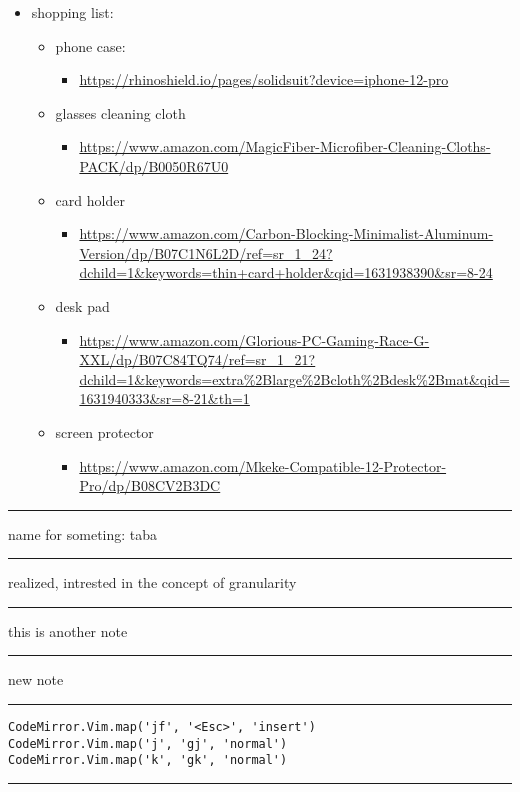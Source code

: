 \documentclass[letterpaper]{article}
\begin{document}
\begin{itemize}
\item shopping list:

\begin{itemize}
\item phone case:

\begin{itemize}
\item \url{https://rhinoshield.io/pages/solidsuit?device=iphone-12-pro}
\end{itemize}

\item glasses cleaning cloth

\begin{itemize}
\item \url{https://www.amazon.com/MagicFiber-Microfiber-Cleaning-Cloths-PACK/dp/B0050R67U0}
\end{itemize}

\item card holder

\begin{itemize}
\item \url{https://www.amazon.com/Carbon-Blocking-Minimalist-Aluminum-Version/dp/B07C1N6L2D/ref=sr\_1\_24?dchild=1\&keywords=thin+card+holder\&qid=1631938390\&sr=8-24}
\end{itemize}

\item desk pad

\begin{itemize}
\item \url{https://www.amazon.com/Glorious-PC-Gaming-Race-G-XXL/dp/B07C84TQ74/ref=sr\_1\_21?dchild=1\&keywords=extra\%2Blarge\%2Bcloth\%2Bdesk\%2Bmat\&qid=1631940333\&sr=8-21\&th=1}
\end{itemize}

\item screen protector

\begin{itemize}
\item \url{https://www.amazon.com/Mkeke-Compatible-12-Protector-Pro/dp/B08CV2B3DC}
\end{itemize}
\end{itemize}
\end{itemize}

\noindent\rule{\textwidth}{0.5pt}

name for someting: taba

\noindent\rule{\textwidth}{0.5pt}

realized, intrested in the concept of granularity

\noindent\rule{\textwidth}{0.5pt}

this is another note

\noindent\rule{\textwidth}{0.5pt}

new note

\noindent\rule{\textwidth}{0.5pt}

\begin{verbatim}
CodeMirror.Vim.map('jf', '<Esc>', 'insert')
CodeMirror.Vim.map('j', 'gj', 'normal')
CodeMirror.Vim.map('k', 'gk', 'normal')
\end{verbatim}

\noindent\rule{\textwidth}{0.5pt}
\end{document}
